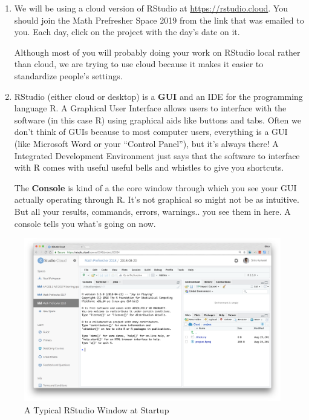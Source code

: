 \documentclass[]{book}
\theoremstyle{definition}
\theoremstyle{definition}
\theoremstyle{definition}
\theoremstyle{remark}
\begin{document}
\begin{enumerate}
\def\labelenumi{\arabic{enumi}.}
\item
  We will be using a cloud version of RStudio at
  \url{https://rstudio.cloud}. You should join the Math Prefresher Space
  2019 from the link that was emailed to you. Each day, click on the
  project with the day's date on it.

  Although most of you will probably doing your work on RStudio local
  rather than cloud, we are trying to use cloud because it makes it
  easier to standardize people's settings.
\item
  RStudio (either cloud or desktop) is a \textbf{GUI} and an IDE for the
  programming language R. A Graphical User Interface allows users to
  interface with the software (in this case R) using graphical aids like
  buttons and tabs. Often we don't think of GUIs because to most
  computer users, everything is a GUI (like Microsoft Word or your
  ``Control Panel''), but it's always there! A Integrated Development
  Environment just says that the software to interface with R comes with
  useful useful bells and whistles to give you shortcuts.

  The \textbf{Console} is kind of a the core window through which you
  see your GUI actually operating through R. It's not graphical so might
  not be as intuitive. But all your results, commands, errors,
  warnings.. you see them in here. A console tells you what's going on
  now.
\end{enumerate}

\begin{figure}
\centering
\includegraphics{images/11_1_rstudio-startup.png}
\caption{A Typical RStudio Window at Startup}
\end{figure}
\end{document}
